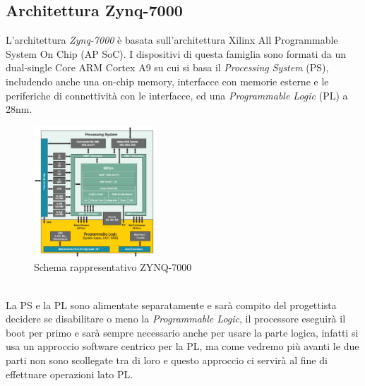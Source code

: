 \subsection{Architettura Zynq-7000}
L'architettura \textit{Zynq-7000} è basata sull'architettura Xilinx All Programmable System On Chip (AP SoC). I dispositivi di questa famiglia sono formati da un dual-single Core ARM Cortex A9 su cui si basa il \textit{Processing System} (PS), includendo anche una on-chip memory, interfacce con memorie esterne e le periferiche di connettività con le interfacce, ed una \textit{Programmable Logic} (PL) a 28nm.
\begin{figure}[h]
\centering
\includegraphics[width=0.4\textwidth]{images/zynq_arch.png}
\caption{Schema rappresentativo ZYNQ-7000\cite{Zynq-7000}}
\end{figure}\\
La PS e la PL sono alimentate separatamente e sarà compito del progettista decidere se disabilitare o meno la \textit{Programmable Logic}, il processore eseguirà il boot per primo e sarà sempre necessario anche per usare la parte logica, infatti si usa un approccio software centrico per la PL, ma come vedremo più avanti le due parti non sono scollegate tra di loro e questo approccio ci servirà al fine di effettuare operazioni lato PL.
